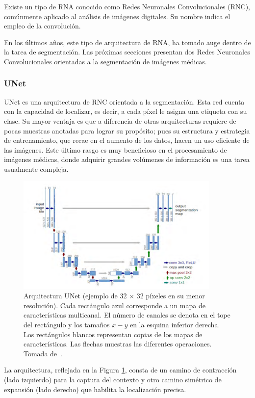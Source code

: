 Existe un tipo de RNA conocido como Redes Neuronales Convolucionales (RNC), comúnmente aplicado al análisis de imágenes digitales. Su nombre indica el empleo de la convolución.

En los últimos años, este tipo de arquitectura de RNA, ha tomado auge dentro de la tarea de segmentación. Las próximas secciones presentan dos Redes Neuronales Convolucionales orientadas a la segmentación de imágenes médicas.

\subsubsection{UNet}

UNet es una arquitectura de RNC orientada a la segmentación. Esta red cuenta con la capacidad de localizar, es decir, a cada píxel le asigna una etiqueta con su clase. Su mayor ventaja es que a diferencia de otras arquitecturas requiere de pocas muestras anotadas para lograr su propósito; pues su estructura y estrategia de entrenamiento, que recae en el aumento de los datos, hacen un uso eficiente de las imágenes. Este último rasgo es muy beneficioso en el procesamiento de imágenes médicas, donde adquirir grandes volúmenes de información es una tarea usualmente compleja.

\begin{figure}[ht]
	\centering
	\includegraphics[width=10cm]{./Graphics/unet.png}
	\caption{Arquitectura UNet (ejemplo de 32 $\times$ 32 píxeles en su menor resolución). Cada rectángulo azul corresponde a un mapa de características multicanal. El número de canales se denota en el tope del rectángulo y los tamaños $x-y$ en la esquina inferior derecha. Los rectángulos blancos representan copias de los mapas de características. Las flechas muestras las diferentes operaciones. Tomada de~\cite{ronneberger2015u}.}
	\label{fig:unet}
\end{figure}

La arquitectura, reflejada en la Figura \ref{fig:unet}, consta de un camino de contracción (lado izquierdo) para la captura del contexto y otro camino simétrico de expansión (lado derecho) que habilita la localización precisa.


